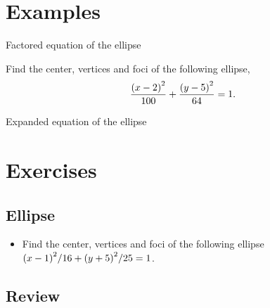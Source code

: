\documentclass[../main-exe.tex]{subfiles}
\begin{document}
\section{Examples}

\begin{example}{Factored equation of the ellipse}{~}

Find the center, vertices and foci of the following ellipse, 
\begin{gather*}
    \frac{\qty(x-2)^2}{100} + \frac{\qty(y-5)^2}{64} = 1.
\end{gather*}

\end{example}

\begin{example}{Expanded equation of the ellipse}{~}

\end{example}


\section{Exercises}

\subsection{Ellipse}

\begin{itemize}
    \item Find the center, vertices and foci of the following ellipse $\qty(x-1)^2/16 + \qty(y+5)^2/25 = 1$.
\end{itemize}

\subsection{Review}
\end{document}
